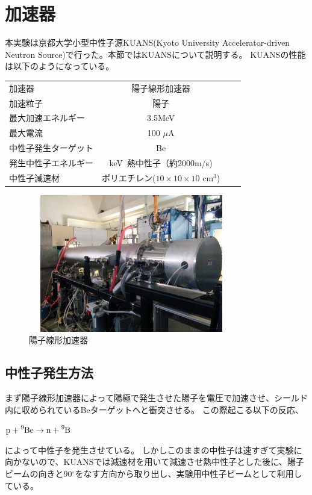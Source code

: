 \begingroup
\section{加速器}
本実験は京都大学小型中性子源KUANS(Kyoto University Accelerator-driven Neutron Source)で行った。本節ではKUANSについて説明する。
KUANSの性能は以下のようになっている。


\begin{table}[htb]\centering
\begin{tabular}{lcrr}
加速器&陽子線形加速器\\
加速粒子&陽子\\
最大加速エネルギー&3.5MeV\\
最大電流&100 $\mu$A \\
中性子発生ターゲット&Be\\
発生中性子エネルギー&keV~熱中性子（約2000m/s)\\
中性子減速材&ポリエチレン($10\times10\times10$ cm$^3$)
\end{tabular}
\end{table}
\begin{figure}[H]
\centering
\includegraphics[width=9cm,height=6cm]{accelerator/accphoto.jpg}
\caption{陽子線形加速器}
\end{figure}

\subsection{中性子発生方法}
まず陽子線形加速器によって陽極で発生させた陽子を電圧で加速させ、シールド内に収められているBeターゲットへと衝突させる。
この際起こる以下の反応、
\begin{center}
$\ce{p} + \ce{^9Be} \to \ce{n} + \ce{^9B}$
\end{center}
によって中性子を発生させている。
しかしこのままの中性子は速すぎて実験に向かないので、KUANSでは減速材を用いて減速させ熱中性子とした後に、陽子ビームの向きと90$^{\circ}$をなす方向から取り出し、実験用中性子ビームとして利用している。
\newpage
